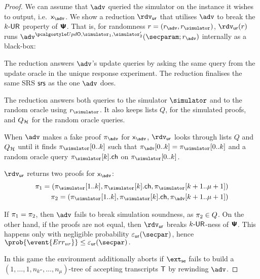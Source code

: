 \begin{proof}
	We can assume that $\adv$ queried the simulator on the instance it wishes to
	output, i.e.~$\inp_{\adv}$. We show a reduction $\rdvur$ that utilises $\adv$ to
	break the ${k\text{-}\mathsf{UR}}$ property of $\bm{\mathsf{\Psi}}$. That is, for randomness $r = (r_\adv, \rsim)$,
	$\rdvur (r)$ runs $\advse^{\initU, \simulator_1, \simulator_2'}(\secparam; r_\adv)$ internally as a black-box:
	\begin{compactitem}
		\item The reduction answers $\adv$'s update queries by asking the same query from the
		update oracle in the unique response experiment. The reduction finalises the same
		SRS $\mathsf{srs}$ as the one $\adv$ does.
		\item The reduction answers both queries to the simulator $\simulator$
		and to the random oracle using $\rsim$. It also keeps lists $Q$, for the simulated proofs,
		and $Q_{\mathcal{H}}$ for the random oracle queries.
		\item When $\adv$ makes a fake proof $\zkproof_{\adv}$ for $\inp_{\adv}$, $\rdvur$
		looks through lists $Q$ and $Q_{\mathcal{H}}$ until it finds $\zkproof_{\simulator}[0..k]$
		such that $\zkproof_{\adv}[0..k] = \zkproof_{\simulator}[0..k]$ and a random
		oracle query $\zkproof_{\simulator}[k].\ch$ on $\zkproof_{\simulator}[0..k]$.
		\item $\rdvur$ returns two proofs for $\inp_{\adv}$:
		\begin{align*}
		\zkproof_1 = (\zkproof_{\simulator}[1..k],
		\zkproof_{\simulator}[k].\ch, \zkproof_{\simulator}[k + 1..\mu + 1])\\
		\zkproof_2 = (\zkproof_{\simulator}[1..k],
		\zkproof_{\simulator}[k].\ch, \zkproof_{\adv}[k + 1..\mu + 1])
		\end{align*}
	\end{compactitem}
	If $\pi_1 = \pi_2$, then $\adv$ fails to break simulation soundness, as
	$\pi_2 \in Q$. On the other hand, if the proofs are not equal, then $\rdvur$
	breaks ${k\text{-}\mathsf{UR}}$-ness of $\bm{\mathsf{\Psi}}$. This happens only with negligible probability
	$\epsur(\secpar)$, hence \( \prob{\event{\errur}} \leq \epsur(\secpar)\,. \)

	 In this game the environment additionally aborts if $\extse$ fails to build a
	$(1, \ldots, 1, n_{k''}, \ldots, n_\mu)$-tree of accepting transcripts $\mathsf{T}$ by rewinding
	$\adv$.
	

\end{proof}
